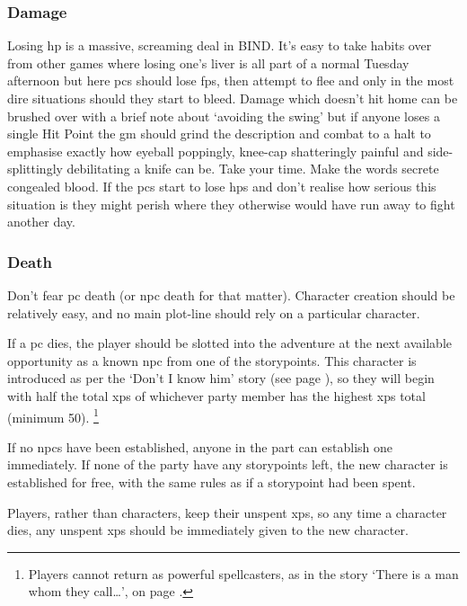 \begin{multicols}{2}
\subsubsection{Damage}

Losing \gls{hp} is a massive, screaming deal in BIND.
It's easy to take habits over from other games where losing one's liver is all part of a normal Tuesday afternoon but here \glspl{pc} should lose \glspl{fp}, then attempt to flee and only in the most dire situations should they start to bleed.
Damage which doesn't hit home can be brushed over with a brief note about `avoiding the swing' but if anyone loses a single Hit Point the \gls{gm} should grind the description and combat to a halt to emphasise exactly how eyeball poppingly, knee-cap shatteringly painful and side-splittingly debilitating a knife can be.
Take your time.
Make the words secrete congealed blood.
If the \glspl{pc} start to lose \glspl{hp} and don't realise how serious this situation is they might perish where they otherwise would have run away to fight another day.

\subsubsection{Death}
\label{pcdeath}

Don't fear \gls{pc} death (or \gls{npc} death for that matter).
Character creation should be relatively easy, and no main plot-line should rely on a particular character.

If a \gls{pc} dies, the player should be slotted into the adventure at the next available opportunity as a known \gls{npc} from one of the \glspl{storypoint}.
This character is introduced as per the `Don't I know him' story (see page \pageref{oldnpc}), so they will begin with half the total \glspl{xp} of whichever party member has the highest \glspl{xp} total (minimum 50).
\footnote{Players cannot return as powerful spellcasters, as in the story `There is a man whom they call\ldots', on page \pageref{tim}.}

If no \glspl{npc} have been established, anyone in the part can establish one immediately.
If none of the party have any \glspl{storypoint} left, the new character is established for free, with the same rules as if a \gls{storypoint} had been spent.

Players, rather than characters, keep their unspent \glspl{xp}, so any time a character dies, any unspent \glspl{xp} should be immediately given to the new character.


\end{multicols}
